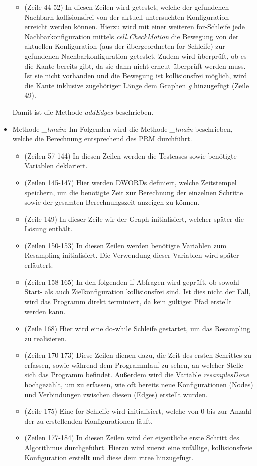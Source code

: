 \documentclass[a4paper]{scrartcl}
\begin{document}
\begin{itemize}
\begin{itemize}
		\item (Zeile 44-52) In diesen Zeilen wird getestet, welche der gefundenen Nachbarn kollisionsfrei von der aktuell untersuchten Konfiguration erreicht werden können. Hierzu wird mit einer weiteren for-Schleife jede Nachbarkonfiguration mittels \textit{cell.CheckMotion} die Bewegung von der aktuellen Konfiguration (aus der übergeordneten for-Schleife) zur gefundenen Nachbarkonfiguration getestet. Zudem wird überprüft, ob es die Kante bereits gibt, da sie dann nicht erneut überprüft werden muss. Ist sie nicht vorhanden und die Bewegung ist kollisionsfrei möglich, wird die Kante inklusive zugehöriger Länge dem Graphen \textit{g} hinzugefügt (Zeile 49).
	\end{itemize}
	Damit ist die Methode \textit{addEdges} beschrieben.
	
	\item Methode \textit{\_tmain}: Im Folgenden wird die Methode \textit{\_tmain} beschrieben, welche die Berechnung entsprechend des PRM durchführt. 
	
	\begin{itemize}
		\item (Zeilen 57-144) In diesen Zeilen werden die Testcases sowie benötigte Variablen deklariert.
		\item (Zeilen 145-147) Hier werden DWORDs definiert, welche Zeitstempel speichern, um die benötigte Zeit zur Berechnung der einzelnen Schritte sowie der gesamten Berechnungszeit anzeigen zu können.
		\item (Zeile 149) In dieser Zeile wir der Graph initialisiert, welcher später die Lösung enthält.
		\item (Zeilen 150-153) In diesen Zeilen werden benötigte Variablen zum Resampling initialisiert. Die Verwendung dieser Variablen wird später erläutert.
		\item (Zeilen 158-165) In den folgenden if-Abfragen wird geprüft, ob sowohl Start- als auch Zielkonfiguration kollisionsfrei sind. Ist dies nicht der Fall, wird das Programm direkt terminiert, da kein gültiger Pfad erstellt werden kann.
		\item (Zeile 168) Hier wird eine do-while Schleife gestartet, um das Resampling zu realisieren.
		
		\item (Zeilen 170-173) Diese Zeilen dienen dazu, die Zeit des ersten Schrittes zu erfassen, sowie während dem Programmlauf zu sehen, an welcher Stelle sich das Programm befindet. Außerdem wird die Variable \textit{resamplesDone} hochgezählt, um zu erfassen, wie oft bereits neue Konfigurationen (Nodes) und Verbindungen zwischen diesen (Edges) erstellt wurden.
		\item (Zeile 175) Eine for-Schleife wird initialisiert, welche von 0 bis zur Anzahl der zu erstellenden Konfigurationen läuft.
		\item (Zeilen 177-184) In diesen Zeilen wird der eigentliche erste Schritt des Algorithmus durchgeführt. Hierzu wird zuerst eine zufällige, kollisionsfreie Konfiguration erstellt und diese dem rtree hinzugefügt. 
		

\end{itemize}
\end{itemize}
\end{document}
